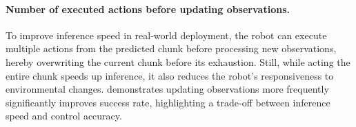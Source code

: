 
\paragraph{Number of executed actions before updating observations.}
To improve inference speed in real-world deployment, the robot can execute multiple actions from the predicted chunk before processing new observations, hereby overwriting the current chunk before its exhaustion.
Still, while acting the entire chunk speeds up inference, it also reduces the robot's responsiveness to environmental changes.
 demonstrates updating observations more frequently significantly improves success rate, highlighting a trade-off between inference speed and control accuracy.


